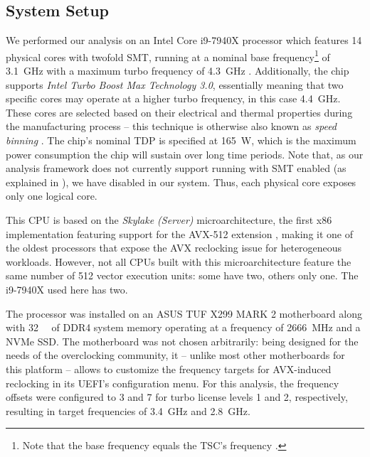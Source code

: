 \subsection{System Setup}
\label{sec:analysis:results:systemsetup}

We performed our analysis on an Intel Core i9-7940X processor which features 14 physical cores with twofold \gls{SMT}, running at a nominal base frequency\footnote{Note that the base frequency equals the \gls{TSC}'s frequency \cite{intelsdmsysprogguide}.} of \SI{3.1}{\giga\hertz} with a maximum turbo frequency of \SI{4.3}{\giga\hertz} \cite{intel7940x}. Additionally, the chip supports \textit{Intel Turbo Boost Max Technology 3.0}, essentially meaning that two specific cores may operate at a higher turbo frequency, in this case \SI{4.4}{\giga\hertz}. These cores are selected based on their electrical and thermal properties during the manufacturing process \cite{intelxeonscalabledeepdive} -- this technique is otherwise also known as \textit{speed binning} \cite{lopata2012speed}. The chip's nominal \gls{TDP} is specified at \SI{165}{\watt}, which is the maximum power consumption the chip will sustain over long time periods. Note that, as our analysis framework does not currently support running with \gls{SMT} enabled (as explained in ), we have disabled  in our system. Thus, each physical core exposes only one logical core.

This \gls{CPU} is based on the \textit{Skylake (Server)} microarchitecture, the first \gls{x86} implementation featuring support for the \gls{AVX-512} extension \cite{intelxeonscalabledeepdive}, making it one of the oldest processors that expose the \gls{AVX} reclocking issue for heterogeneous workloads. However, not all \glspl{CPU} built with this microarchitecture feature the same number of \SI[number-unit-product=-]{512}{\bit} vector execution units: some have two, others only one. The i9-7940X used here has two.

The processor was installed on an ASUS TUF X299 MARK 2 motherboard along with \SI{32}{\gibi\byte} of DDR4 system memory operating at a frequency of \SI{2666}{\mega\hertz} and a \gls{NVMe} \acrlong{SSD}. The motherboard was not chosen arbitrarily: being designed for the needs of the overclocking community, it -- unlike most other motherboards for this platform -- allows to customize the frequency targets for \gls{AVX}-induced reclocking in its \gls{UEFI}'s configuration menu. For this analysis, the frequency offsets were configured to 3 and 7 for turbo license levels 1 and 2, respectively, resulting in target frequencies of \SI{3.4}{\giga\hertz} and \SI{2.8}{\giga\hertz}.

